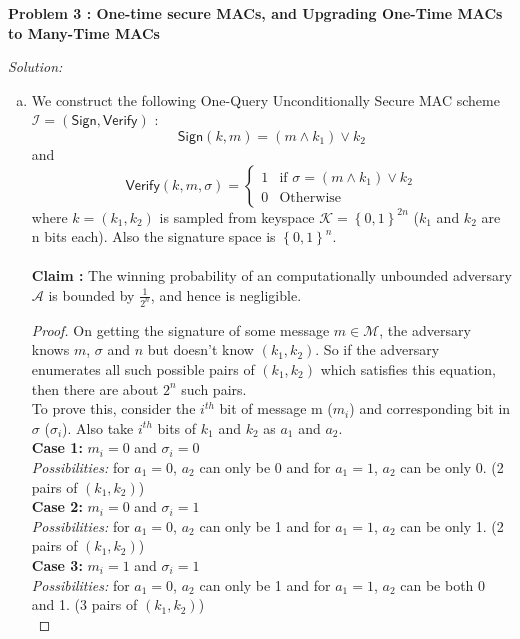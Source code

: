 \documentclass[a4paper, 11pt]{article}
\newenvironment{solution}
    {\textit{Solution:}}
    {\clearpage}
\newcommand{\prob}[1]{\begin{mdframed}[backgroundcolor=gray!20] \textbf{Problem #1}\end{mdframed}}
\newcommand{\bit}{\left\{0, 1\right\}}
\newcommand{\sign}{\mathsf{Sign}}
\newcommand{\verif}{\mathsf{Verify}}
\newcommand{\calA}{\mathcal{A}}
\newcommand{\calI}{\mathcal{I}}
\newcommand{\calK}{\mathcal{K}}
\newcommand{\calM}{\mathcal{M}}
\begin{document}
\prob{3 : One-time secure MACs, and Upgrading One-Time MACs to Many-Time MACs}
\begin{solution}
    \begin{enumerate}[(a)]
        \item We construct the following One-Query Unconditionally Secure MAC scheme $\calI = (\sign, \verif)$ :
              $$\sign(k, m) = (m \wedge k_1) \vee k_2$$ and
              $$\verif(k, m, \sigma) = \begin{cases}
                      1 & \text{if } \sigma =  (m \wedge k_1) \vee k_2 \\
                      0 & \text{Otherwise}
                  \end{cases}$$
              where $k = (k_1, k_2)$ is sampled from keyspace $\calK = \bit^{2n}$ ($k_1$ and $k_2$ are n bits each). Also the signature space is $\bit^n$. \\ \\
              \textbf{Claim :} The winning probability of an computationally unbounded adversary $\calA$ is bounded by $\frac{1}{2^n}$, and hence is negligible.
              \begin{proof} On getting the signature of some message $m \in \calM$, the adversary knows $m$, $\sigma$ and $n$ but doesn't know $(k_1, k_2)$. So if the adversary enumerates all such possible pairs of $(k_1, k_2)$ which satisfies this equation, then there are about $2^n$ such pairs. \\
              To prove this, consider the $i^{th}$ bit of message m ($m_i$) and corresponding bit in $\sigma$ ($\sigma_i$). Also take $i^{th}$ bits of $k_1$ and $k_2$ as $a_1$ and $a_2$. \\
              \textbf{Case 1:} $m_i = 0$ and $\sigma_i = 0$ \\
              \textit{Possibilities:} for $a_1 = 0$, $a_2$ can only be 0 and for $a_1 = 1$, $a_2$ can be only 0. (2 pairs of $(k_1, k_2)$)\\
              \textbf{Case 2:} $m_i = 0$ and $\sigma_i = 1$ \\
              \textit{Possibilities:} for $a_1 = 0$, $a_2$ can only be 1 and for $a_1 = 1$, $a_2$ can be only 1. (2 pairs of $(k_1, k_2)$)\\
              \textbf{Case 3:} $m_i = 1$ and $\sigma_i = 1$ \\
              \textit{Possibilities:} for $a_1 = 0$, $a_2$ can only be 1 and for $a_1 = 1$, $a_2$ can be both 0 and 1. (3 pairs of $(k_1, k_2)$)\\

\end{proof}
\end{enumerate}
\end{solution}
\end{document}
